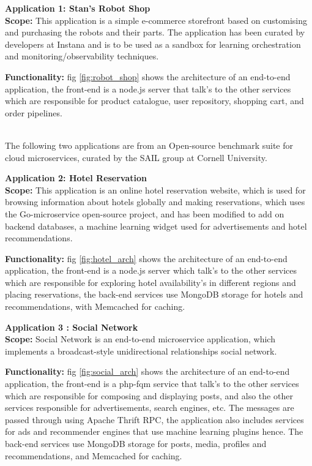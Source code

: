 
\textbf{Application 1: Stan’s Robot Shop}\\
\textbf{Scope:} This application is a simple e-commerce storefront based on customising and purchasing the robots and their parts. The application has been curated by developers at Instana and is to be used as a sandbox for learning orchestration and monitoring/observability techniques. \cite{Instana18}

\textbf{Functionality:} fig \ref{fig:robot_shop} shows the architecture of an end-to-end application, the front-end is a node.js server that talk's to the other services which are responsible for product catalogue, user repository, shopping cart, and order pipelines. \cite{Instana18}

\\
The following two applications are from an Open-source benchmark suite for cloud microservices, curated by the SAIL group at Cornell University. \cite{deathstar} 

\textbf{Application 2: Hotel Reservation}\\
\textbf{Scope:} This application is an online hotel reservation website, which is used for browsing information about hotels globally and making reservations, which uses the Go-microservice open-source project, and has been modified to add on backend databases, a machine learning widget used for advertisements and hotel recommendations. \cite{deathstar}

\textbf{Functionality:} fig \ref{fig:hotel_arch} shows the architecture of an end-to-end application, the front-end is a node.js server which talk's to the other services which are responsible for exploring hotel availability's in different regions and placing reservations, the back-end services use MongoDB storage for hotels and recommendations, with Memcached for caching. \cite{deathstar} 

\textbf{Application 3 : Social Network}\\
\textbf{Scope: }Social Network is an end-to-end microservice application, which implements a broadcast-style unidirectional relationships social network.  \cite{deathstar}

\textbf{Functionality:} fig \ref{fig:social_arch} shows the architecture of an end-to-end application, the front-end is a php-fqm service that talk's to the other services which are responsible for composing and displaying posts, and also the other services responsible for advertisements, search engines, etc. The messages are passed through using Apache Thrift RPC, the application also includes services for ads and recommender engines that use machine learning plugins hence. The back-end services use MongoDB storage for posts, media, profiles and recommendations, and Memcached for caching.   \cite{deathstar}


